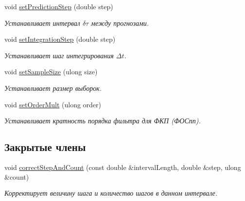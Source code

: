 \begin{DoxyCompactItemize}
\hypertarget{class_core_1_1_filter_parameters_abc28925f9ee2213da37a000dc761cb05}{}\label{class_core_1_1_filter_parameters_abc28925f9ee2213da37a000dc761cb05} 
void \hyperlink{class_core_1_1_filter_parameters_abc28925f9ee2213da37a000dc761cb05}{set\+Prediction\+Step} (double step)
\begin{DoxyCompactList}\small\item\em Устанавливает интервал $\delta \tau$ между прогнозами. \end{DoxyCompactList}\item 
\hypertarget{class_core_1_1_filter_parameters_a8349d4d94febddd3367865b60b3deed5}{}\label{class_core_1_1_filter_parameters_a8349d4d94febddd3367865b60b3deed5} 
void \hyperlink{class_core_1_1_filter_parameters_a8349d4d94febddd3367865b60b3deed5}{set\+Integration\+Step} (double step)
\begin{DoxyCompactList}\small\item\em Устанавливает шаг интегрирования $\Delta t$. \end{DoxyCompactList}\item 
\hypertarget{class_core_1_1_filter_parameters_a3b7b8345d450d60f8e4fbe7bbe825fd6}{}\label{class_core_1_1_filter_parameters_a3b7b8345d450d60f8e4fbe7bbe825fd6} 
void \hyperlink{class_core_1_1_filter_parameters_a3b7b8345d450d60f8e4fbe7bbe825fd6}{set\+Sample\+Size} (ulong size)
\begin{DoxyCompactList}\small\item\em Устанавливает размер выборок. \end{DoxyCompactList}\item 
\hypertarget{class_core_1_1_filter_parameters_a763a74eb5ae44bfde79110a38bb79867}{}\label{class_core_1_1_filter_parameters_a763a74eb5ae44bfde79110a38bb79867} 
void \hyperlink{class_core_1_1_filter_parameters_a763a74eb5ae44bfde79110a38bb79867}{set\+Order\+Mult} (ulong order)
\begin{DoxyCompactList}\small\item\em Устанавливает кратность порядка фильтра для ФКП (ФОСпп). \end{DoxyCompactList}\end{DoxyCompactItemize}
\subsection*{Закрытые члены}
\begin{DoxyCompactItemize}
\item 
void \hyperlink{class_core_1_1_filter_parameters_abd97b1d6389fb381e9808f15a271dfc3}{correct\+Step\+And\+Count} (const double \&interval\+Length, double \&step, ulong \&count)
\begin{DoxyCompactList}\small\item\em Корректирует величину шага и количество шагов в данном интервале. \end{DoxyCompactList}\end{DoxyCompactItemize}
